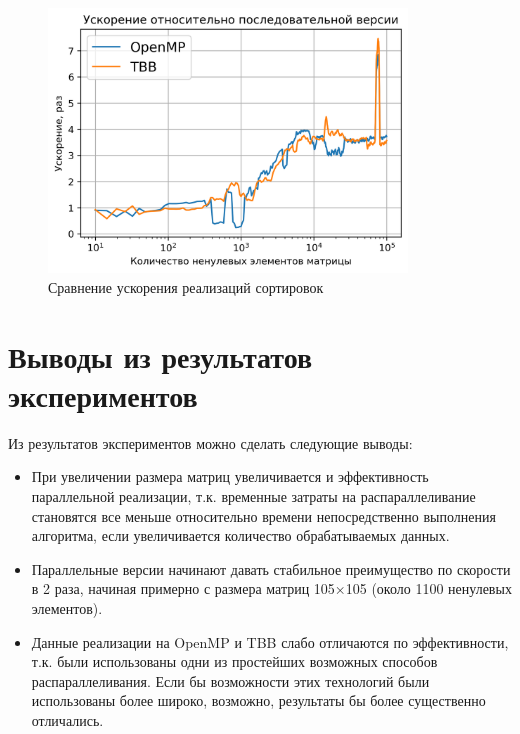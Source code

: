 \documentclass{report}
\begin{document}
\begin{figure}[H]
    \centering
    \includegraphics[width=0.85\textwidth]{../../modules/task_1/kolosova_a_complex_ccs/images/speed_comparison.png}
    \caption{Сравнение ускорения реализаций сортировок}
    \label{fig:my_label_1}
\end{figure}

\newpage

\section*{Выводы из результатов экспериментов}
\par Из результатов экспериментов можно сделать следующие выводы:
\begin{itemize}
    \item При увеличении размера матриц увеличивается и эффективность параллельной реализации, т.к. временные затраты на распараллеливание становятся все меньше относительно времени непосредственно выполнения алгоритма, если увеличивается количество обрабатываемых данных.
    \item Параллельные версии начинают давать стабильное преимущество по скорости в 2 раза, начиная примерно с размера матриц 105×105 (около 1100 ненулевых элементов).
    \item Данные реализации на OpenMP и TBB слабо отличаются по эффективности, т.к. были использованы одни из простейших возможных способов распараллеливания. Если бы возможности этих технологий были использованы более широко, возможно, результаты бы более существенно отличались.
\end{itemize}
\end{document}
